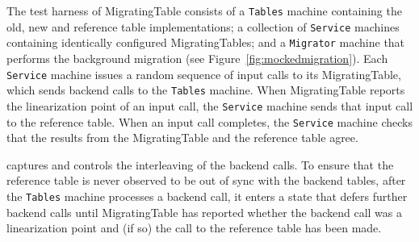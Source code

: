 
The \psharp test harness of MigratingTable consists of a \texttt{Tables} machine containing the old, new and reference table implementations; a collection of \texttt{Service} machines containing identically configured MigratingTables; and a \texttt{Migrator} machine that performs the background migration (see Figure~\ref{fig:mockedmigration}). Each \texttt{Service} machine issues a random sequence of input calls to its MigratingTable, which sends backend calls to the \texttt{Tables} machine. When MigratingTable reports the linearization point of an input call, the \texttt{Service} machine sends that input call to the reference table.  When an input call completes, the \texttt{Service} machine checks that the results from the MigratingTable and the reference table agree.

\psharp captures and controls the interleaving of the backend calls. To ensure that the reference table is never observed to be out of sync with the backend tables, after the \texttt{Tables} machine processes a backend call, it enters a state that defers further backend calls until MigratingTable has reported whether the backend call was a linearization point and (if so) the call to the reference table has been made.



